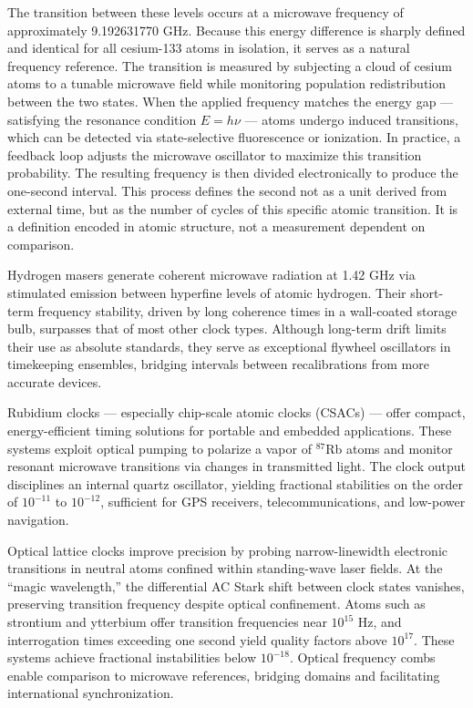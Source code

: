 The transition between these levels occurs at a microwave frequency of approximately 9.192631770 GHz. Because this energy difference is sharply defined and identical for all cesium-133 atoms in isolation, it serves as a natural frequency reference. The transition is measured by subjecting a cloud of cesium atoms to a tunable microwave field while monitoring population redistribution between the two states. When the applied frequency matches the energy gap — satisfying the resonance condition $E = h\nu$ — atoms undergo induced transitions, which can be detected via state-selective fluorescence or ionization. In practice, a feedback loop adjusts the microwave oscillator to maximize this transition probability. The resulting frequency is then divided electronically to produce the one-second interval. This process defines the second not as a unit derived from external time, but as the number of cycles of this specific atomic transition. It is a definition encoded in atomic structure, not a measurement dependent on comparison.

Hydrogen masers generate coherent microwave radiation at 1.42 GHz via stimulated emission between hyperfine levels of atomic hydrogen. Their short-term frequency stability, driven by long coherence times in a wall-coated storage bulb, surpasses that of most other clock types. Although long-term drift limits their use as absolute standards, they serve as exceptional flywheel oscillators in timekeeping ensembles, bridging intervals between recalibrations from more accurate devices.

Rubidium clocks — especially chip-scale atomic clocks (CSACs) — offer compact, energy-efficient timing solutions for portable and embedded applications. These systems exploit optical pumping to polarize a vapor of $^{87}$Rb atoms and monitor resonant microwave transitions via changes in transmitted light. The clock output disciplines an internal quartz oscillator, yielding fractional stabilities on the order of $10^{-11}$ to $10^{-12}$, sufficient for GPS receivers, telecommunications, and low-power navigation.

Optical lattice clocks improve precision by probing narrow-linewidth electronic transitions in neutral atoms confined within standing-wave laser fields. At the “magic wavelength,” the differential AC Stark shift between clock states vanishes, preserving transition frequency despite optical confinement. Atoms such as strontium and ytterbium offer transition frequencies near $10^{15}$ Hz, and interrogation times exceeding one second yield quality factors above $10^{17}$. These systems achieve fractional instabilities below $10^{-18}$. Optical frequency combs enable comparison to microwave references, bridging domains and facilitating international synchronization.

